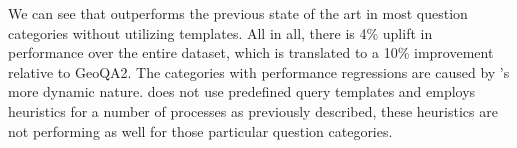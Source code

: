 \begin{table}[hbt]
    \centering
    \caption{Evaluation on GeoQuestions1089$_c$ v1.1}\label{tab:geoq1089}
\end{table}

We can see that \EngineName{} outperforms the previous state of the art in most question categories without utilizing templates. All in all, there is 4\% uplift in performance over the entire dataset, which is translated to a 10\% improvement relative to GeoQA2. The categories with performance regressions are caused by \EngineName{}’s more dynamic nature. \EngineName{} does not use predefined query templates and employs heuristics for a number of processes as previously described, these heuristics are not performing as well for those particular question categories. 
